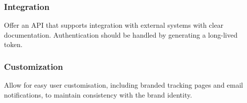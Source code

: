 \subsubsection{Integration}
Offer an API that supports integration with external systems with clear documentation.
Authentication should be handled by generating a long-lived token.

\subsubsection{Customization}
Allow for easy user customisation, including branded tracking pages and email notifications, to maintain consistency with the brand identity.



